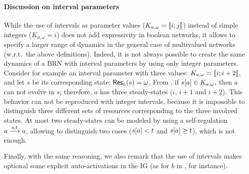 \paragraph{Discussion on interval parameters}
While the use of intervals as parameter values ($K_{a,\omega} = \llbracket i ; j \rrbracket$) instead of simple integers ($K_{a,\omega} = i$) does not add expressivity in boolean networks,
it allows to specify a larger range of dynamics in the general case of multivalued networks (w.r.t.~the above definitions).
Indeed, it is not always possible to create the same dynamics of a BRN with interval parameters by using only integer parameters.
Consider for example an interval parameter with three values: $K_{a,\omega} = \llbracket i ; i+2 \rrbracket$,
and let $s$ be its corresponding state: $\mathsf{Res}_{a}(s) = \omega$.
From , if ${s[a]} \in K_{a,\omega}$, then $a$ can not evolve in $s$; therefore, $a$ has three steady-states ($i$, $i+1$ and $i+2$).
This behavior can not be reproduced with integer intervals, because it is impossible to distinguish three different sets of resources corresponding to the three involved states.
At most two steady-states can be modeled by using a self-regulation $a \xrightarrow{s, t} a$, allowing to distinguish two cases (${s[a]} < t$ and ${s[a]} \geq t$), which is not enough.
\begin{comment}
Indeed, assume that $K_{a,\omega} = \segm{i}{i+2}$;
we aim at obtaining the same dynamics with three different integer parameters instead: $K_{a,\omega_1} = i$,  $K_{a,\omega_2} = i+1$, $K_{a,\omega_3} = i+2$.
The only possible modification in the resources of $a$ is to add a self-regulation $\GRNedge{a}{s}{t}{a}$.
However, because resources have a boolean definition
(each component can be only below or above the threshold related to its regulation on $a$),
it is not possible to differentiate the 3 sets of resources $\omega_1$, $\omega_2$ and $\omega_3$
by relying only on the regulation of $a$ on itself.
\end{comment}
Finally, with the same reasoning, we also remark that the use of intervals makes optional some explicit auto-activations in the IG
(as for $b$ in , for instance).
